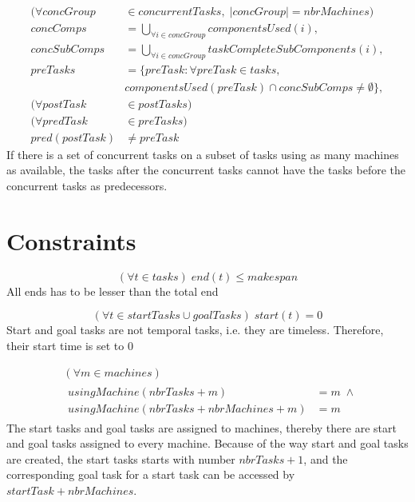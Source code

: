  \begin{equation}
 \begin{aligned}\label{eq:91}
 (\forall concGroup &\in concurrentTasks, \; |concGroup| = nbrMachines) \\
 concComps &= \bigcup_{\forall i \in concGroup}componentsUsed(i), \\
 concSubComps &= \bigcup_{\forall i \in concGroup}taskCompleteSubComponents(i), \\
 preTasks &= \{preTask : \forall preTask \in tasks,\\
 &componentsUsed(preTask) \cap concSubComps \neq \emptyset\}, \\
 (\forall postTask &\in postTasks) \\
 (\forall predTask &\in preTasks) \\
 pred(postTask) &\neq preTask
 \end{aligned}
 \end{equation}
 If there is a set of concurrent tasks on a subset of tasks using as many machines as available, the tasks after the concurrent tasks cannot have the tasks before the concurrent tasks as predecessors.
 
 
 \section{Constraints}
 
 \begin{equation}\label{eq:92}
 (\forall t \in tasks) \; end(t) \le makespan
 \end{equation}
 All ends has to be lesser than the total end
 
 \begin{equation}\label{eq:93}
 (\forall t \in startTasks \cup goalTasks) \; start(t) = 0
 \end{equation}
 Start and goal tasks are not temporal tasks, i.e. they are timeless. Therefore, their start time is set to 0
 
 
 \begin{equation}
 \begin{aligned}\label{eq:94}
 &(\forall m \in machines) \\
 &\begin{aligned}
 usingMachine(nbrTasks + m) &= m \; \land\\
 usingMachine(nbrTasks + nbrMachines + m) &= m
 \end{aligned}
 \end{aligned}
 \end{equation}
 The start tasks and goal tasks are assigned to machines, thereby there are start and goal tasks assigned to every machine. Because of the way start and goal tasks are created, the start tasks starts with number $nbrTasks + 1$, and the corresponding goal task for a start task can be accessed by $startTask + nbrMachines$.
 
